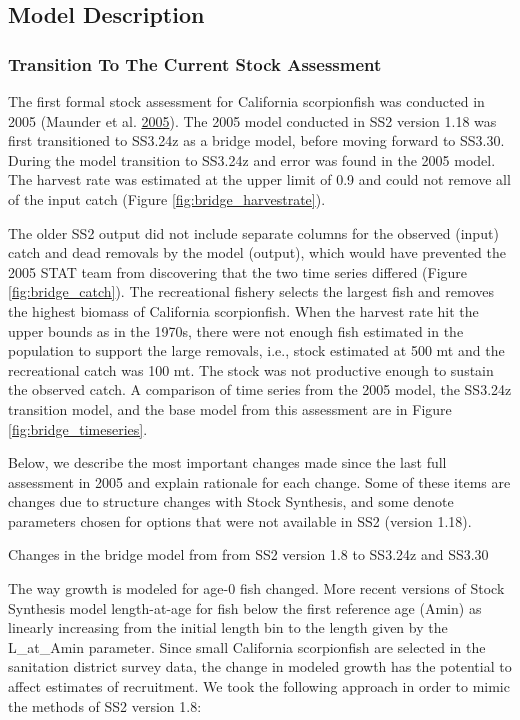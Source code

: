 \documentclass[12pt,]{article}
\begin{document}
\subsection{Model Description}\label{model-description}

\subsubsection{Transition To The Current Stock
Assessment}\label{transition-to-the-current-stock-assessment}

The first formal stock assessment for California scorpionfish was
conducted in 2005 (Maunder et al.
\protect\hyperlink{ref-Maunder2005}{2005}). The 2005 model conducted in
SS2 version 1.18 was first transitioned to SS3.24z as a bridge model,
before moving forward to SS3.30. During the model transition to SS3.24z
and error was found in the 2005 model. The harvest rate was estimated at
the upper limit of 0.9 and could not remove all of the input catch
(Figure \ref{fig:bridge_harvestrate}).

The older SS2 output did not include separate columns for the observed
(input) catch and dead removals by the model (output), which would have
prevented the 2005 STAT team from discovering that the two time series
differed (Figure \ref{fig:bridge_catch}). The recreational fishery
selects the largest fish and removes the highest biomass of California
scorpionfish. When the harvest rate hit the upper bounds as in the
1970s, there were not enough fish estimated in the population to support
the large removals, i.e., stock estimated at 500 mt and the recreational
catch was 100 mt. The stock was not productive enough to sustain the
observed catch. A comparison of time series from the 2005 model, the
SS3.24z transition model, and the base model from this assessment are in
Figure \ref{fig:bridge_timeseries}.

Below, we describe the most important changes made since the last full
assessment in 2005 and explain rationale for each change. Some of these
items are changes due to structure changes with Stock Synthesis, and
some denote parameters chosen for options that were not available in SS2
(version 1.18).

Changes in the bridge model from from SS2 version 1.8 to SS3.24z and
SS3.30

The way growth is modeled for age-0 fish changed. More recent versions
of Stock Synthesis model length-at-age for fish below the first
reference age (Amin) as linearly increasing from the initial length bin
to the length given by the L\_at\_Amin parameter. Since small California
scorpionfish are selected in the sanitation district survey data, the
change in modeled growth has the potential to affect estimates of
recruitment. We took the following approach in order to mimic the
methods of SS2 version 1.8:
\end{document}
